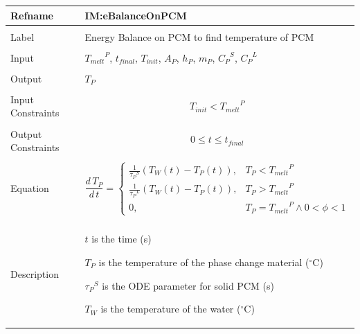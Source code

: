 \documentclass[12pt]{article}
\begin{document}
\noindent \begin{minipage}{\textwidth}
\begin{tabular}{p{} p{}}
\toprule \textbf{Refname} & \textbf{IM:eBalanceOnPCM}
\label{IM:eBalanceOnPCM}
\\ \midrule \\
Label & Energy Balance on PCM to find temperature of PCM
\\ \midrule \\
Input & ${{T_{melt}}^{P}}$, ${t_{final}}$, ${T_{init}}$, ${A_{P}}$, ${h_{P}}$, ${m_{P}}$, ${{C_{P}}^{S}}$, ${{C_{P}}^{L}}$
\\ \midrule \\
Output & ${T_{P}}$
\\ \midrule \\
Input Constraints & \begin{displaymath}
                    {T_{init}}<{{T_{melt}}^{P}}
                    \end{displaymath}
\\ \midrule \\
Output Constraints & \begin{displaymath}
                     0\leq{}t\leq{}{t_{final}}
                     \end{displaymath}
\\ \midrule \\
Equation & \begin{displaymath}
           \frac{d\,{T_{P}}}{d\,t}=\begin{cases}
\frac{1}{{{τ_{P}}^{S}}} \left({T_{W}}\left(t\right)-{T_{P}}\left(t\right)\right), & {T_{P}}<{{T_{melt}}^{P}}\\
\frac{1}{{{τ_{P}}^{L}}} \left({T_{W}}\left(t\right)-{T_{P}}\left(t\right)\right), & {T_{P}}>{{T_{melt}}^{P}}\\
0, & {T_{P}}={{T_{melt}}^{P}}\land{}0<ϕ<1
\end{cases}
           \end{displaymath}
\\ \midrule \\
Description & \begin{symbDescription}
              \item{$t$ is the time (s)}
              \item{${T_{P}}$ is the temperature of the phase change material (${}^{\circ}$C)}
              \item{${{τ_{P}}^{S}}$ is the ODE parameter for solid PCM (s)}
              \item{${T_{W}}$ is the temperature of the water (${}^{\circ}$C)}

\end{symbDescription}
\end{tabular}
\end{minipage}
\end{document}
